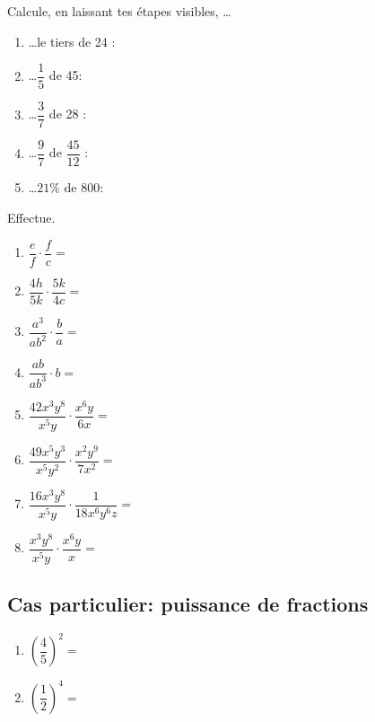\documentclass[../../syllabus_2.tex]{subfiles}
\begin{document}
\begin{exercise}
  Calcule, en laissant tes étapes visibles, \dots
  \begin{enumerate}[itemsep=3cm]
    \item \dots le tiers de 24 :
    \item \dots $\dfrac{1}{5}$ de 45:
    \item \dots $\dfrac{3}{7}$ de 28 :
    \item \dots $\dfrac{9}{7}$ de $\dfrac{45}{12}$ :
    \item \dots $21\%$ de 800:
  \end{enumerate}
  \vspace*{3cm}
\end{exercise}

\newpage
\begin{exercise}
  Effectue. 
  \begin{enumerate}[cols=2, itemsep=5cm]
    \item  $\dfrac{e}{f} \cdot \dfrac{f}{c}=$
    \item  $\dfrac{4h}{5k} \cdot \dfrac{5k}{4c}=$
    \item  $\dfrac{a^3}{ab^2} \cdot \dfrac{b}{a}=$
    \item  $\dfrac{ab}{ab^3} \cdot b=$
    \item  $\dfrac{42x^3y^8}{x^5y} \cdot \dfrac{x^6y}{6x}=$
    \item  $\dfrac{49x^5y^3}{x^5y^2} \cdot \dfrac{x^2y^9}{7x^2}=$
    \item  $\dfrac{16x^3y^8}{x^5y} \cdot \dfrac{1}{18 x^6 y^6 z}=$
    \item  $\dfrac{x^3y^8}{x^5y} \cdot \dfrac{x^6y}{x}=$
  \end{enumerate}
\end{exercise}

\newpage

\subsection*{Cas particulier: puissance de fractions}


\exemples 
\begin{enumerate}[cols=2, itemsep=3cm]
  \item $\left(\dfrac{4}{5}\right)^2=$
  \item $\left(\dfrac{1}{2}\right)^4=$
\end{enumerate}
\end{document}
